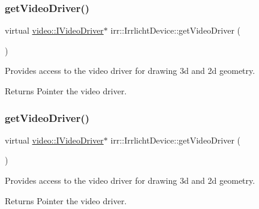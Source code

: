 \subsubsection{\texorpdfstring{get\+Video\+Driver()}{getVideoDriver()}\hspace{0.1cm}{\footnotesize\ttfamily [2/3]}}
{\footnotesize\ttfamily virtual \hyperlink{classirr_1_1video_1_1IVideoDriver}{video\+::\+I\+Video\+Driver}$\ast$ irr\+::\+Irrlicht\+Device\+::get\+Video\+Driver (\begin{DoxyParamCaption}{ }\end{DoxyParamCaption})\hspace{0.3cm}{\ttfamily [pure virtual]}}



Provides access to the video driver for drawing 3d and 2d geometry. 

\begin{DoxyReturn}{Returns}
Pointer the video driver. 
\end{DoxyReturn}
\mbox{\label{classirr_1_1IrrlichtDevice_ada90707ba5c645d47e000e4e0f87c4c4}} 
\subsubsection{\texorpdfstring{get\+Video\+Driver()}{getVideoDriver()}\hspace{0.1cm}{\footnotesize\ttfamily [3/3]}}
{\footnotesize\ttfamily virtual \hyperlink{classirr_1_1video_1_1IVideoDriver}{video\+::\+I\+Video\+Driver}$\ast$ irr\+::\+Irrlicht\+Device\+::get\+Video\+Driver (\begin{DoxyParamCaption}{ }\end{DoxyParamCaption})\hspace{0.3cm}{\ttfamily [pure virtual]}}



Provides access to the video driver for drawing 3d and 2d geometry. 

\begin{DoxyReturn}{Returns}
Pointer the video driver. 
\end{DoxyReturn}
\mbox{\label{classirr_1_1IrrlichtDevice_a8872867a5ad728a4673679e9e8f469e7}} 
